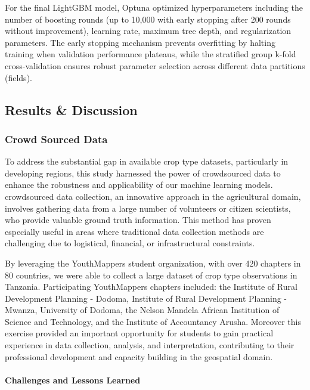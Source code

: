 \documentclass[
  journal,
  twocolumn]{IEEEtran}
\begin{document}
For the final LightGBM model, Optuna optimized hyperparameters including
the number of boosting rounds (up to 10,000 with early stopping after
200 rounds without improvement), learning rate, maximum tree depth, and
regularization parameters. The early stopping mechanism prevents
overfitting by halting training when validation performance plateaus,
while the stratified group k-fold cross-validation ensures robust
parameter selection across different data partitions (fields).

\subsection{Results \& Discussion}\label{results-discussion}

\subsubsection{Crowd Sourced Data}\label{crowd-sourced-data}

To address the substantial gap in available crop type datasets,
particularly in developing regions, this study harnessed the power of
crowdsourced data to enhance the robustness and applicability of our
machine learning models. crowdsourced data collection, an innovative
approach in the agricultural domain, involves gathering data from a
large number of volunteers or citizen scientists, who provide valuable
ground truth information. This method has proven especially useful in
areas where traditional data collection methods are challenging due to
logistical, financial, or infrastructural constraints.

By leveraging the YouthMappers student organization, with over 420
chapters in 80 countries, we were able to collect a large dataset of
crop type observations in Tanzania. Participating YouthMappers chapters
included: the Institute of Rural Development Planning - Dodoma,
Institute of Rural Development Planning - Mwanza, University of Dodoma,
the Nelson Mandela African Institution of Science and Technology, and
the Institute of Accountancy Arusha. Moreover this exercise provided an
important opportunity for students to gain practical experience in data
collection, analysis, and interpretation, contributing to their
professional development and capacity building in the geospatial domain.

\paragraph{Challenges and Lessons
Learned}\label{challenges-and-lessons-learned}
\end{document}
